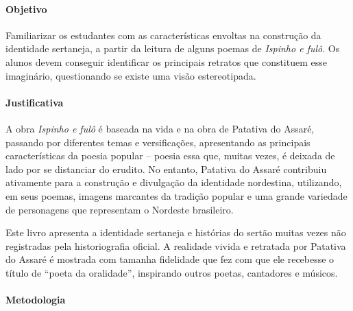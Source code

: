 \documentclass[12pt]{extarticle}
\begin{document}
\paragraph{Objetivo} Familiarizar os estudantes com as características 
envoltas na construção da identidade sertaneja, a partir da leitura de 
alguns poemas de \emph{Ispinho e fulô}.
Os alunos devem conseguir identificar os principais retratos que 
constituem esse imaginário, questionando se existe uma visão estereotipada. 


\paragraph{Justificativa} A obra \emph{Ispinho e fulô} é baseada na vida 
e na obra de Patativa do Assaré, passando por diferentes temas e 
versificações, apresentando as principais características da poesia 
popular -- poesia essa que, muitas vezes, é deixada de lado por se 
distanciar do erudito.
No entanto, Patativa do Assaré contribuiu ativamente para a construção e
divulgação da identidade nordestina, utilizando, em seus poemas, imagens
marcantes da tradição popular e uma grande variedade de personagens que
representam o Nordeste brasileiro.

Este livro apresenta a identidade sertaneja e histórias do sertão muitas
vezes não registradas pela historiografia oficial. A realidade vivida e
retratada por Patativa do Assaré é mostrada com tamanha fidelidade que
fez com que ele recebesse o título de ``poeta da oralidade'', inspirando
outros poetas, cantadores e músicos.

\paragraph{Metodologia}
\end{document}
